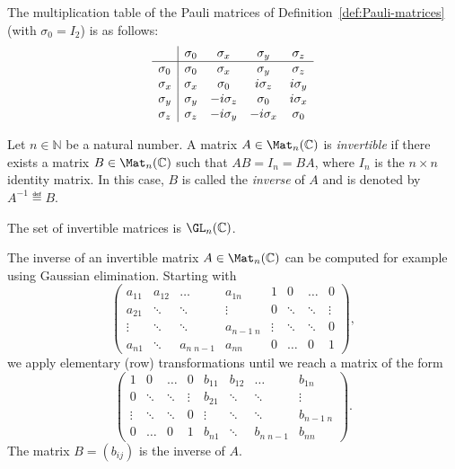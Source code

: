 \documentclass[a4paper,oneside, 12pt]{amsart}
\begin{document}
\begin{example}\label{ex:multiplication-table}
  The multiplication table of the Pauli matrices of Definition~\ref{def:Pauli-matrices} (with \(\sigma_{0}=I_{2}\)) is as follows:
  \begin{equation*}
    \begin{array}{l| c c c c}
      & \sigma_{0} & \sigma_{x} & \sigma_{y} & \sigma_{z} \\\hline
      \sigma_{0} & \sigma_{0} & \sigma_{x} & \sigma_{y} & \sigma_{z} \\
      \sigma_{x} & \sigma_{x} & \sigma_{0} & i \sigma_{z} & i\sigma_{y} \\
      \sigma_{y} & \sigma_{y} & -i \sigma_{z} & \sigma_{0} & i\sigma_{x} \\
      \sigma_{z} & \sigma_{z} & -i \sigma_{y} & - i\sigma_{x} & \sigma_{0}
    \end{array}
  \end{equation*}
\end{example}

\begin{definition}\label{def:invertible-matrix}
  Let \(n\in \mathbb{N}\) be a natural number.
  A matrix \( A \in \Mat_n(\mathbb{C}) \) is \emph{invertible} if there exists a matrix \( B \in \Mat_n(\mathbb{C}) \) such that \( AB = I_n = BA \), where \( I_n \) is the \( n \times n \) identity matrix.
  In this case, \( B \) is called the \emph{inverse} of \( A \) and is denoted by \( A^{-1} \eqdef B\).

  The set of invertible matrices is \(\GL_{n}( \mathbb{C})\).
\end{definition}
The inverse of an invertible matrix \(A\in \Mat_{n}( \mathbb{C})\) can be computed for example using Gaussian elimination.
Starting with
\begin{equation*}
  \left(\begin{array}{cccc|cccc}
    a_{11}& a_{12} & \dots & a_{1n}& 1 & 0 & \dots & 0 \\
    a_{21}& \ddots & \ddots & \vdots& 0 & \ddots &\ddots & \vdots \\
    \vdots& \ddots & \ddots & a_{n-1 \;n}& \vdots & \ddots & \ddots & 0 \\
    a_{n1}& \ddots & a_{n\; n-1} & a_{nn}& 0 & \dots & 0 & 1
  \end{array}\right),
\end{equation*}
we apply elementary (row) transformations until we reach a matrix of the form
\begin{equation*}
  \left(\begin{array}{cccc|cccc}
     1 & 0 & \dots & 0 & b_{11}& b_{12} & \dots & b_{1n} \\
     0 & \ddots & \ddots & \vdots & b_{21}& \ddots & \ddots & \vdots \\
    \vdots & \ddots & \ddots & 0 & \vdots& \ddots & \ddots & b_{n-1 \;n} \\
    0 & \dots & 0 & 1 & b_{n1}& \ddots & b_{n\; n-1} & b_{nn}
  \end{array}\right).
\end{equation*}
The matrix \(B=(b_{ij})\) is the inverse of \(A\).
\bigskip
\end{document}
